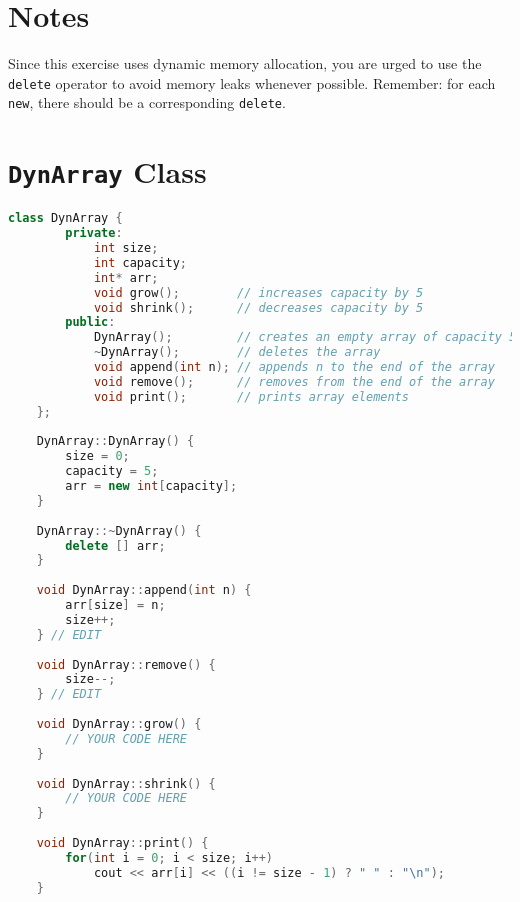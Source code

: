 \documentclass[11 pt]{article}
\begin{document}
\section{Notes}

Since this exercise uses dynamic memory allocation, you are urged to use the \texttt{delete} operator to avoid memory leaks whenever possible. Remember: for each \texttt{new}, there should be a corresponding \texttt{delete}.

\newpage

\section{\texttt{DynArray} Class}


\begin{lstlisting}[language=C++]
    class DynArray {
        private:
            int size;
            int capacity;
            int* arr;
            void grow();        // increases capacity by 5
            void shrink();      // decreases capacity by 5
        public:
            DynArray();         // creates an empty array of capacity 5
            ~DynArray();        // deletes the array
            void append(int n); // appends n to the end of the array
            void remove();      // removes from the end of the array
            void print();       // prints array elements
    };
    
    DynArray::DynArray() {
        size = 0;
        capacity = 5;
        arr = new int[capacity];
    }
    
    DynArray::~DynArray() {
        delete [] arr;
    }
    
    void DynArray::append(int n) {
        arr[size] = n;
        size++;
    } // EDIT
    
    void DynArray::remove() {
        size--;
    } // EDIT
    
    void DynArray::grow() {
        // YOUR CODE HERE
    }
    
    void DynArray::shrink() {
        // YOUR CODE HERE
    }
    
    void DynArray::print() {
        for(int i = 0; i < size; i++)
            cout << arr[i] << ((i != size - 1) ? " " : "\n");
    }
\end{lstlisting}
\end{document}
